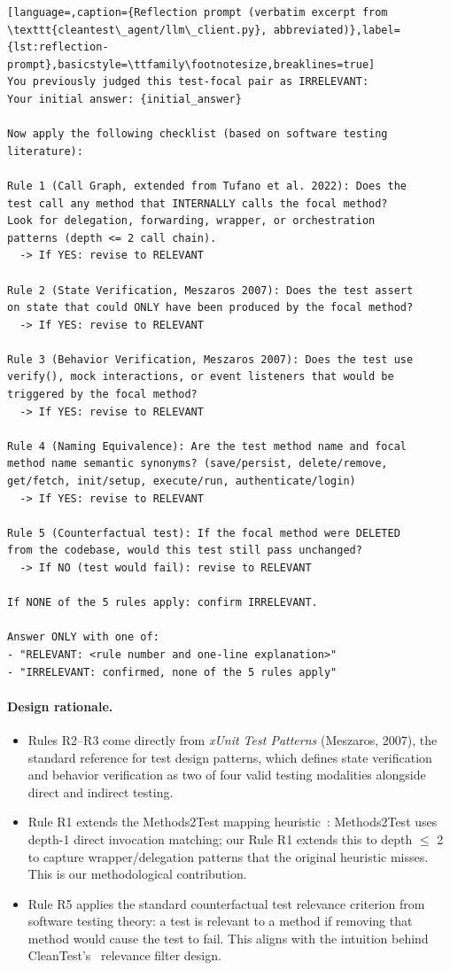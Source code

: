 \documentclass[acmlarge,nonacm,screen]{acmart}
\begin{document}
\begin{lstlisting}[language=,caption={Reflection prompt (verbatim excerpt from \texttt{cleantest\_agent/llm\_client.py}, abbreviated)},label={lst:reflection-prompt},basicstyle=\ttfamily\footnotesize,breaklines=true]
You previously judged this test-focal pair as IRRELEVANT:
Your initial answer: {initial_answer}

Now apply the following checklist (based on software testing
literature):

Rule 1 (Call Graph, extended from Tufano et al. 2022): Does the
test call any method that INTERNALLY calls the focal method?
Look for delegation, forwarding, wrapper, or orchestration
patterns (depth <= 2 call chain).
  -> If YES: revise to RELEVANT

Rule 2 (State Verification, Meszaros 2007): Does the test assert
on state that could ONLY have been produced by the focal method?
  -> If YES: revise to RELEVANT

Rule 3 (Behavior Verification, Meszaros 2007): Does the test use
verify(), mock interactions, or event listeners that would be
triggered by the focal method?
  -> If YES: revise to RELEVANT

Rule 4 (Naming Equivalence): Are the test method name and focal
method name semantic synonyms? (save/persist, delete/remove,
get/fetch, init/setup, execute/run, authenticate/login)
  -> If YES: revise to RELEVANT

Rule 5 (Counterfactual test): If the focal method were DELETED
from the codebase, would this test still pass unchanged?
  -> If NO (test would fail): revise to RELEVANT

If NONE of the 5 rules apply: confirm IRRELEVANT.

Answer ONLY with one of:
- "RELEVANT: <rule number and one-line explanation>"
- "IRRELEVANT: confirmed, none of the 5 rules apply"
\end{lstlisting}

\paragraph{Design rationale.}
\begin{itemize}
    \item Rules R2--R3 come directly from \textit{xUnit Test Patterns} (Meszaros, 2007), the standard reference for test design patterns, which defines state verification and behavior verification as two of four valid testing modalities alongside direct and indirect testing.
    \item Rule R1 extends the Methods2Test mapping heuristic~\cite{tufano2022methods2test}: Methods2Test uses depth-1 direct invocation matching; our Rule R1 extends this to depth $\leq$ 2 to capture wrapper/delegation patterns that the original heuristic misses. This is our methodological contribution.
    \item Rule R5 applies the standard counterfactual test relevance criterion from software testing theory: a test is relevant to a method if removing that method would cause the test to fail. This aligns with the intuition behind CleanTest's~\cite{zhang2025cleantest} relevance filter design.
\end{itemize}
\end{document}
